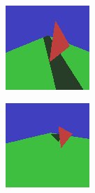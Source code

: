 \documentclass{article}
\begin{document}
\begin{multicols}{2}
\begin{figure}
\centering
\includegraphics[width=\linewidth]{./imgs/output2}
\caption{}
\label{fig:output2}
\end{figure}

\begin{figure}
\centering
\includegraphics[width=\linewidth]{./imgs/output3}
\caption{}
\label{fig:output3}
\end{figure}


\end{multicols}
\end{document}
